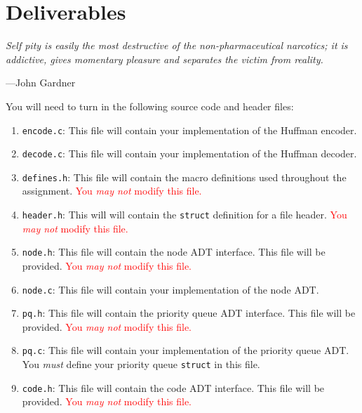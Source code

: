 \section{Deliverables}
\textwidth
\epigraph{\emph{Self pity is easily the most destructive of the non-pharmaceutical narcotics; it is addictive, gives momentary pleasure and separates the victim from reality.}}{---John Gardner}

\noindent You will need to turn in the following source code and header files:

\begin{enumerate}
  \item \texttt{encode.c}: This file will contain your implementation of the
    Huffman encoder.

  \item \texttt{decode.c}: This file will contain your implementation of the
    Huffman decoder.

  \item \texttt{defines.h}: This file will contain the macro definitions
    used throughout the assignment. \textcolor{red}{You \emph{may not}
    modify this file.}

  \item \texttt{header.h}: This will will contain the \texttt{struct}
    definition for a file header. \textcolor{red}{You \emph{may not}
    modify this file.}

  \item \texttt{node.h}: This file will contain the node ADT interface.
    This file will be provided. \textcolor{red}{You \emph{may not}
    modify this file.}

  \item \texttt{node.c}: This file will contain your implementation of
    the node ADT.

  \item \texttt{pq.h}: This file will contain the priority queue ADT
    interface. This file will be provided. \textcolor{red}{You \emph{may
    not} modify this file.}

  \item \texttt{pq.c}: This file will contain your implementation of the
    priority queue ADT. You \emph{must} define your priority queue
    \texttt{struct} in this file.

  \item \texttt{code.h}: This file will contain the code ADT interface.
    This file will be provided. \textcolor{red}{You \emph{may not}
    modify this file.}


\end{enumerate}
